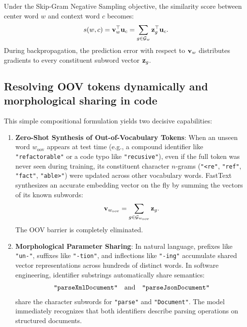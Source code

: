 \documentclass[../../../main.tex]{subfiles}
\begin{document}
Under the Skip-Gram Negative Sampling objective, the similarity score between center word $w$ and context word $c$ becomes:
\begin{equation}
\label{eq:fasttext_scoring}
s(w, c) = \mathbf{v}_w^\top \mathbf{u}_c = \sum_{g \in \mathcal{G}_w} \mathbf{z}_g^\top \mathbf{u}_c.
\end{equation}
During backpropagation, the prediction error with respect to $\mathbf{v}_w$ distributes gradients to every constituent subword vector $\mathbf{z}_g$.

\subsection{Resolving OOV tokens dynamically and morphological sharing in code}
\label{subsec:fasttext_oov_resolution}

This simple compositional formulation yields two decisive capabilities:

\begin{enumerate}
    \item \textbf{Zero-Shot Synthesis of Out-of-Vocabulary Tokens}:
    When an unseen word $w_{\text{oov}}$ appears at test time (e.g., a compound identifier like \texttt{"refactorable"} or a code typo like \texttt{"recusive"}), even if the full token was never seen during training, its constituent character $n$-grams (\texttt{"<re"}, \texttt{"ref"}, \texttt{"fact"}, \texttt{"able>"}) were updated across other vocabulary words.
    FastText synthesizes an accurate embedding vector on the fly by summing the vectors of its known subwords:
    \begin{equation}
    \label{eq:fasttext_oov_synth}
    \mathbf{v}_{w_{\text{oov}}} = \sum_{g \in \mathcal{G}_{w_{\text{oov}}}} \mathbf{z}_g.
    \end{equation}
    The OOV barrier is completely eliminated.
    
    \item \textbf{Morphological Parameter Sharing}:
    In natural language, prefixes like \texttt{"un-"}, suffixes like \texttt{"-tion"}, and inflections like \texttt{"-ing"} accumulate shared vector representations across hundreds of distinct words.
    In software engineering, identifier substrings automatically share semantics:
    \begin{equation}
    \label{eq:code_subword_sharing}
    \text{\texttt{"parseXmlDocument"}} \quad \text{and} \quad \text{\texttt{"parseJsonDocument"}}
    \end{equation}
    share the character subwords for \texttt{"parse"} and \texttt{"Document"}. The model immediately recognizes that both identifiers describe parsing operations on structured documents.
\end{enumerate}
\end{document}
